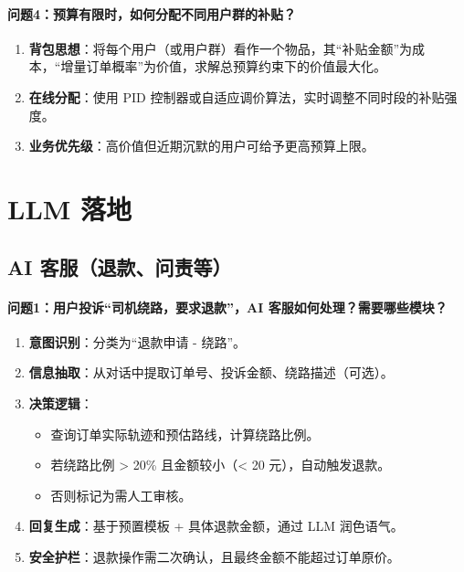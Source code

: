 \documentclass[12pt,a4paper]{article}
\begin{document}
\paragraph{问题4：预算有限时，如何分配不同用户群的补贴？}
\begin{enumerate}[label=(\arabic*)]
\item \textbf{背包思想}：将每个用户（或用户群）看作一个物品，其“补贴金额”为成本，“增量订单概率”为价值，求解总预算约束下的价值最大化。
\item \textbf{在线分配}：使用 PID 控制器或自适应调价算法，实时调整不同时段的补贴强度。
\item \textbf{业务优先级}：高价值但近期沉默的用户可给予更高预算上限。
\end{enumerate}

\section{LLM 落地}

\subsection{AI 客服（退款、问责等）}

\paragraph{问题1：用户投诉“司机绕路，要求退款”，AI 客服如何处理？需要哪些模块？}
\begin{enumerate}[label=(\arabic*)]
\item \textbf{意图识别}：分类为“退款申请 - 绕路”。
\item \textbf{信息抽取}：从对话中提取订单号、投诉金额、绕路描述（可选）。
\item \textbf{决策逻辑}：
\begin{itemize}
  \item 查询订单实际轨迹和预估路线，计算绕路比例。
  \item 若绕路比例 > 20\% 且金额较小（< 20 元），自动触发退款。
  \item 否则标记为需人工审核。
\end{itemize}
\item \textbf{回复生成}：基于预置模板 + 具体退款金额，通过 LLM 润色语气。
\item \textbf{安全护栏}：退款操作需二次确认，且最终金额不能超过订单原价。
\end{enumerate}
\end{document}
